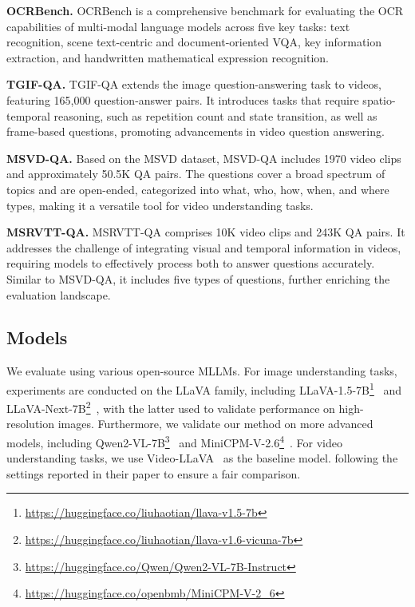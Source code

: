 \textbf{OCRBench.} OCRBench is a comprehensive benchmark for evaluating the OCR capabilities of multi-modal language models across five key tasks: text recognition, scene text-centric and document-oriented VQA, key information extraction, and handwritten mathematical expression recognition.

\textbf{TGIF-QA.} TGIF-QA extends the image question-answering task to videos, featuring 165,000 question-answer pairs. It introduces tasks that require spatio-temporal reasoning, such as repetition count and state transition, as well as frame-based questions, promoting advancements in video question answering.

\textbf{MSVD-QA.} Based on the MSVD dataset, MSVD-QA includes 1970 video clips and approximately 50.5K QA pairs. The questions cover a broad spectrum of topics and are open-ended, categorized into what, who, how, when, and where types, making it a versatile tool for video understanding tasks.

\textbf{MSRVTT-QA.} MSRVTT-QA comprises 10K video clips and 243K QA pairs. It addresses the challenge of integrating visual and temporal information in videos, requiring models to effectively process both to answer questions accurately. Similar to MSVD-QA, it includes five types of questions, further enriching the evaluation landscape.

\subsection{Models}\label{app:models}
We evaluate \algname using various open-source MLLMs. For image understanding tasks, experiments are conducted on the LLaVA family, including LLaVA-1.5-7B\footnote{\url{https://huggingface.co/liuhaotian/llava-v1.5-7b}}~\citep{liu2024visual} and LLaVA-Next-7B\footnote{\url{https://huggingface.co/liuhaotian/llava-v1.6-vicuna-7b}}~\citep{liu2024llavanext}, with the latter used to validate performance on high-resolution images.
Furthermore, we validate our method on more advanced models, including Qwen2-VL-7B\footnote{\url{https://huggingface.co/Qwen/Qwen2-VL-7B-Instruct}}~\citep{wang2024qwen2} and MiniCPM-V-2.6\footnote{\url{https://huggingface.co/openbmb/MiniCPM-V-2_6}}~\citep{yao2024minicpm}.
For video understanding tasks, we use Video-LLaVA~\citep{lin2023video} as the baseline model.
following the settings reported in their paper to ensure a fair comparison.

